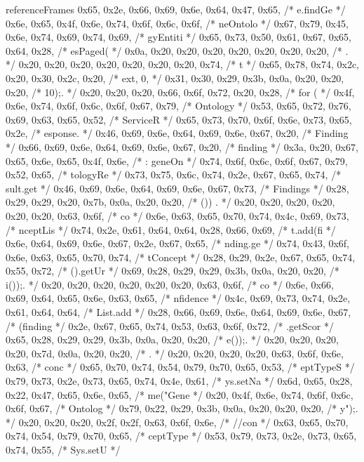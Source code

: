 \begin{chunk}{referenceFrames}
{{{{{0x65, 0x2e, 0x66, 0x69, 0x6e, 0x64, 0x47, 0x65, /* e.findGe */
0x6e, 0x65, 0x4f, 0x6e, 0x74, 0x6f, 0x6c, 0x6f, /* neOntolo */
0x67, 0x79, 0x45, 0x6e, 0x74, 0x69, 0x74, 0x69, /* gyEntiti */
0x65, 0x73, 0x50, 0x61, 0x67, 0x65, 0x64, 0x28, /* esPaged( */
0x0a, 0x20, 0x20, 0x20, 0x20, 0x20, 0x20, 0x20, /* .        */
0x20, 0x20, 0x20, 0x20, 0x20, 0x20, 0x20, 0x74, /*        t */
0x65, 0x78, 0x74, 0x2c, 0x20, 0x30, 0x2c, 0x20, /* ext, 0,  */
0x31, 0x30, 0x29, 0x3b, 0x0a, 0x20, 0x20, 0x20, /* 10);.    */
0x20, 0x20, 0x20, 0x66, 0x6f, 0x72, 0x20, 0x28, /*    for ( */
0x4f, 0x6e, 0x74, 0x6f, 0x6c, 0x6f, 0x67, 0x79, /* Ontology */
0x53, 0x65, 0x72, 0x76, 0x69, 0x63, 0x65, 0x52, /* ServiceR */
0x65, 0x73, 0x70, 0x6f, 0x6e, 0x73, 0x65, 0x2e, /* esponse. */
0x46, 0x69, 0x6e, 0x64, 0x69, 0x6e, 0x67, 0x20, /* Finding  */
0x66, 0x69, 0x6e, 0x64, 0x69, 0x6e, 0x67, 0x20, /* finding  */
0x3a, 0x20, 0x67, 0x65, 0x6e, 0x65, 0x4f, 0x6e, /* : geneOn */
0x74, 0x6f, 0x6c, 0x6f, 0x67, 0x79, 0x52, 0x65, /* tologyRe */
0x73, 0x75, 0x6c, 0x74, 0x2e, 0x67, 0x65, 0x74, /* sult.get */
0x46, 0x69, 0x6e, 0x64, 0x69, 0x6e, 0x67, 0x73, /* Findings */
0x28, 0x29, 0x29, 0x20, 0x7b, 0x0a, 0x20, 0x20, /* ()) {.   */
0x20, 0x20, 0x20, 0x20, 0x20, 0x20, 0x63, 0x6f, /*       co */
0x6e, 0x63, 0x65, 0x70, 0x74, 0x4c, 0x69, 0x73, /* nceptLis */
0x74, 0x2e, 0x61, 0x64, 0x64, 0x28, 0x66, 0x69, /* t.add(fi */
0x6e, 0x64, 0x69, 0x6e, 0x67, 0x2e, 0x67, 0x65, /* nding.ge */
0x74, 0x43, 0x6f, 0x6e, 0x63, 0x65, 0x70, 0x74, /* tConcept */
0x28, 0x29, 0x2e, 0x67, 0x65, 0x74, 0x55, 0x72, /* ().getUr */
0x69, 0x28, 0x29, 0x29, 0x3b, 0x0a, 0x20, 0x20, /* i());.   */
0x20, 0x20, 0x20, 0x20, 0x20, 0x20, 0x63, 0x6f, /*       co */
0x6e, 0x66, 0x69, 0x64, 0x65, 0x6e, 0x63, 0x65, /* nfidence */
0x4c, 0x69, 0x73, 0x74, 0x2e, 0x61, 0x64, 0x64, /* List.add */
0x28, 0x66, 0x69, 0x6e, 0x64, 0x69, 0x6e, 0x67, /* (finding */
0x2e, 0x67, 0x65, 0x74, 0x53, 0x63, 0x6f, 0x72, /* .getScor */
0x65, 0x28, 0x29, 0x29, 0x3b, 0x0a, 0x20, 0x20, /* e());.   */
0x20, 0x20, 0x20, 0x20, 0x7d, 0x0a, 0x20, 0x20, /*     }.   */
0x20, 0x20, 0x20, 0x20, 0x63, 0x6f, 0x6e, 0x63, /*     conc */
0x65, 0x70, 0x74, 0x54, 0x79, 0x70, 0x65, 0x53, /* eptTypeS */
0x79, 0x73, 0x2e, 0x73, 0x65, 0x74, 0x4e, 0x61, /* ys.setNa */
0x6d, 0x65, 0x28, 0x22, 0x47, 0x65, 0x6e, 0x65, /* me("Gene */
0x20, 0x4f, 0x6e, 0x74, 0x6f, 0x6c, 0x6f, 0x67, /*  Ontolog */
0x79, 0x22, 0x29, 0x3b, 0x0a, 0x20, 0x20, 0x20, /* y");.    */
0x20, 0x20, 0x20, 0x2f, 0x2f, 0x63, 0x6f, 0x6e, /*    //con */
0x63, 0x65, 0x70, 0x74, 0x54, 0x79, 0x70, 0x65, /* ceptType */
0x53, 0x79, 0x73, 0x2e, 0x73, 0x65, 0x74, 0x55, /* Sys.setU */
}}}}}
\end{chunk}
